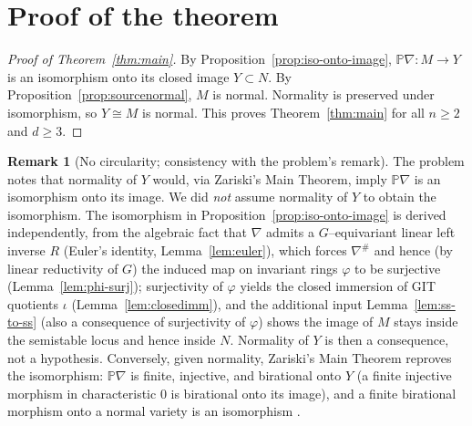 \documentclass{amsart}
\theoremstyle{definition}
\newtheorem{remark}{Remark}
\newcommand{\PP}{\mathbb{P}}
\newcommand{\nab}{\nabla}
\begin{document}
\section{Proof of the theorem}\label{sec:conclude}

\begin{proof}[Proof of Theorem~\ref{thm:main}]
By Proposition~\ref{prop:iso-onto-image}, $\PP\nab\colon M\to Y$ is an isomorphism onto its
closed image $Y\subset N$. By Proposition~\ref{prop:sourcenormal}, $M$ is normal. Normality
is preserved under isomorphism, so $Y\cong M$ is normal. This proves Theorem~\ref{thm:main}
for all $n\ge 2$ and $d\ge 3$.
\end{proof}

\begin{remark}[No circularity; consistency with the problem's remark]
The problem notes that normality of $Y$ would, via Zariski's Main Theorem, imply $\PP\nab$ is
an isomorphism onto its image. We did \emph{not} assume normality of $Y$ to obtain the
isomorphism. The isomorphism in Proposition~\ref{prop:iso-onto-image} is derived
independently, from the algebraic fact that $\nab$ admits a $G$--equivariant linear left
inverse $R$ (Euler's identity, Lemma~\ref{lem:euler}), which forces $\nab^{\#}$ and hence (by
linear reductivity of $G$) the induced map on invariant rings $\varphi$ to be surjective
(Lemma~\ref{lem:phi-surj}); surjectivity of $\varphi$ yields the closed immersion of GIT
quotients $\iota$ (Lemma~\ref{lem:closedimm}), and the additional input
Lemma~\ref{lem:ss-to-ss} (also a consequence of surjectivity of $\varphi$) shows the image of
$M$ stays inside the semistable locus and hence inside $N$. Normality of $Y$ is then a
consequence, not a hypothesis. Conversely, given normality, Zariski's Main Theorem reproves
the isomorphism: $\PP\nab$ is finite, injective, and birational onto $Y$ (a finite injective
morphism in characteristic $0$ is birational onto its image), and a finite birational morphism
onto a normal variety is an isomorphism \cite[Ch.~III, \S 9]{Mumford-RB}.
\end{remark}
\end{document}
